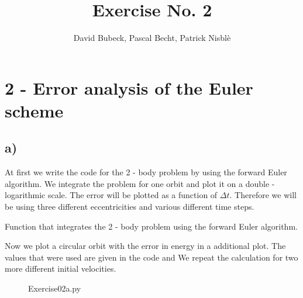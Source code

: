 \documentclass[11pt, a4paper, reqno]{scrartcl}
\begin{document}
    \title{Exercise No. 2}
    \author{David Bubeck, Pascal Becht, Patrick Nisbl\`e}
    \maketitle
    

    \newpage
    \section*{2 - Error analysis of the Euler scheme}

    	\subsection*{a)}
			At first we write the code for the 2 - body problem by using the 
			forward Euler algorithm. We integrate the problem for one orbit and 
			plot it on a double - logarithmic scale. The error will be plotted 
			as a function of $\Delta t$. Therefore we will be using three 
			different eccentricities and various different time steps.
			\newline
			
			Function that integrates the 2 - body problem using the forward 
			Euler algorithm.
			
    		\begin{figure}[H]
        		        
    		\end{figure}
    		
    		
    		Now we plot a circular orbit with the error in energy in a 
    		additional plot. The values that were used are given in the code and We repeat the calculation for two more different initial velocities.
    		
    		\begin{figure}[H]
        		
        			{Exercise02a.py}   
    		\end{figure}
    		
\end{document}
